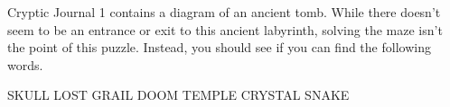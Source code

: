 Cryptic Journal 1 contains a diagram of
an ancient tomb. While there doesn't seem
to be an entrance or exit to this ancient
labyrinth, solving the maze isn't the point
of this puzzle. Instead, you should see
if you can find the following words.

SKULL
LOST
GRAIL
DOOM
TEMPLE
CRYSTAL
SNAKE
